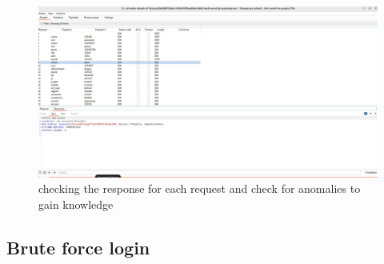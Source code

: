 \documentclass[
	a4paper, %
	12pt, %
]{CSSullivanBusinessReport}
\begin{document}
\begin{fullwidth}
 \begin{figure}[H]
    \centering
    \includegraphics[width=1\textwidth]{Images/anikaScreensots/credentialStuff3.png}
    \caption{checking the response for each request and check for anomalies to gain knowledge}
    \label{fig:enter-label}
\end{figure}
 

\end{fullwidth}
\subsection*{Brute force login}
\end{document}
